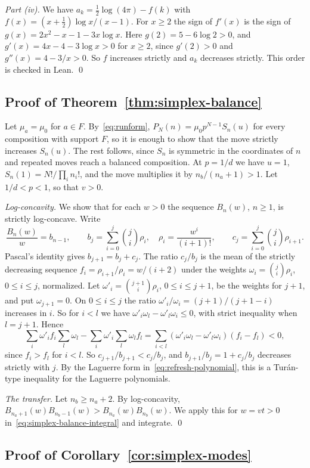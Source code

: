 \emph{Part (iv).} We have $a_k=\frac12\log(4\pi)-f(k)$ with
$f(x)=(x+\frac12)\log x/(x-1)$. For $x\ge2$ the sign of $f'(x)$ is the sign of
$g(x)=2x^2-x-1-3x\log x$. Here $g(2)=5-6\log2>0$, and
$g'(x)=4x-4-3\log x>0$ for $x\ge2$, since $g'(2)>0$ and
$g''(x)=4-3/x>0$. So $f$ increases strictly and $a_k$ decreases strictly. This order is
checked in Lean. \qed

\subsection{Proof of Theorem~\ref{thm:simplex-balance}}

Let $\mu_a=\mu_0$ for $a\in F$. By~\eqref{eq:runform}, $P_N(n)=\mu_0p^{N-1}S_n(u)$ for every
composition with support $F$, so it is enough to show that the move strictly increases $S_n(u)$.
The rest follows, since $S_n$ is symmetric in the coordinates of $n$ and repeated moves reach a
balanced composition. At $p=1/d$ we have $u=1$, $S_n(1)=N!/\prod_in_i!$, and the move multiplies
it by $n_b/(n_a+1)>1$. Let $1/d<p<1$, so that $v>0$.

\emph{Log-concavity.} We show that for each $w>0$ the sequence $B_n(w)$,
$n\ge1$, is strictly log-concave. Write
\[
\frac{B_n(w)}w=b_{n-1},\qquad
b_j=\sum_{i=0}^j\binom ji\rho_i,\quad
\rho_i=\frac{w^i}{(i+1)!},\qquad
c_j=\sum_{i=0}^j\binom ji\rho_{i+1}.
\]
Pascal's identity gives $b_{j+1}=b_j+c_j$. The ratio $c_j/b_j$ is the mean of the
strictly decreasing sequence $f_i=\rho_{i+1}/\rho_i=w/(i+2)$ under the weights
$\omega_i=\binom ji\rho_i$, $0\le i\le j$, normalized. Let $\omega'_i=\binom{j+1}i\rho_i$,
$0\le i\le j+1$, be the weights for $j+1$, and put $\omega_{j+1}=0$. On
$0\le i\le j$ the ratio $\omega'_i/\omega_i=(j+1)/(j+1-i)$ increases in $i$. So for
$i<l$ we have $\omega'_i\omega_l-\omega'_l\omega_i\le0$, with strict inequality when
$l=j+1$. Hence
\[
\sum_i\omega'_if_i\sum_l\omega_l-\sum_i\omega'_i\sum_l\omega_lf_l
=\sum_{i<l}(\omega'_i\omega_l-\omega'_l\omega_i)(f_i-f_l)<0,
\]
since $f_i>f_l$ for $i<l$. So $c_{j+1}/b_{j+1}<c_j/b_j$, and $b_{j+1}/b_j=1+c_j/b_j$
decreases strictly with $j$. By the Laguerre form in~\eqref{eq:refresh-polynomial}, this is a
Tur\'an-type inequality for the Laguerre polynomials.

\emph{The transfer.} Let $n_b\ge n_a+2$. By log-concavity,
$B_{n_a+1}(w)B_{n_b-1}(w)>B_{n_a}(w)B_{n_b}(w)$. We apply this
for $w=vt>0$ in~\eqref{eq:simplex-balance-integral} and integrate. \qed

\subsection{Proof of Corollary~\ref{cor:simplex-modes}}

